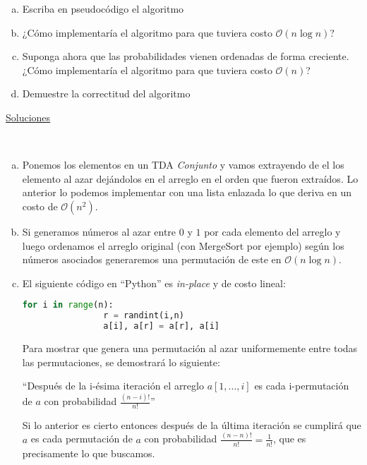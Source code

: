 \documentclass[dcc,uchile]{fcfmcourse}
\begin{document}
\begin{problems}
\begin{enumerate}[a)]
\item Escriba en pseudocódigo el algoritmo
\item ¿Cómo implementaría el algoritmo para que tuviera costo $\mathcal{O}(n\log n)$?
\item Suponga ahora que las probabilidades vienen ordenadas de forma creciente. ¿Cómo implementaría el algoritmo para que tuviera costo $\mathcal{O}(n)$?
\item Demuestre la correctitud del algoritmo 
\end{enumerate}
\end{problems}
\newpage
\begin{center}
{\huge \underline{Soluciones}}
\end{center}
\begin{problems}
\\
\begin{enumerate}[a)]
    \item Ponemos los elementos en un TDA \textit{Conjunto} y vamos extrayendo de el los elemento al azar dejándolos en el arreglo en el orden que fueron extraídos. Lo anterior lo podemos implementar con una lista enlazada lo que deriva en un costo de $\mathcal{O}(n^2)$.\flash
    \item Si generamos números al azar entre $0$ y $1$ por cada elemento del arreglo y luego ordenamos el arreglo original (con MergeSort por ejemplo) según los números asociados generaremos una permutación de este en $\mathcal{O}(n\log n)$.\flash
    \item El siguiente código en ``Python'' es \textit{in-place} y de costo lineal:
        \begin{lstlisting}[language=Python]
            for i in range(n):
                r = randint(i,n)
                a[i], a[r] = a[r], a[i]
        \end{lstlisting}
        Para mostrar que genera una permutación al azar uniformemente entre todas las permutaciones, se demostrará lo siguiente:
        \begin{center}
        ``Después de la i-ésima iteración el arreglo $a[1,\ldots,i]$ es cada i-permutación de $a$ con probabilidad $\frac{(n-i)!}{n!}$''
        \end{center}
        Si lo anterior es cierto entonces después de la última iteración se cumplirá que $a$ es cada permutación de $a$ con probabilidad $\frac{(n-n)!}{n!} = \frac{1}{n!}$, que es precisamente lo que buscamos.\\
        

\end{enumerate}
\end{problems}
\end{document}
